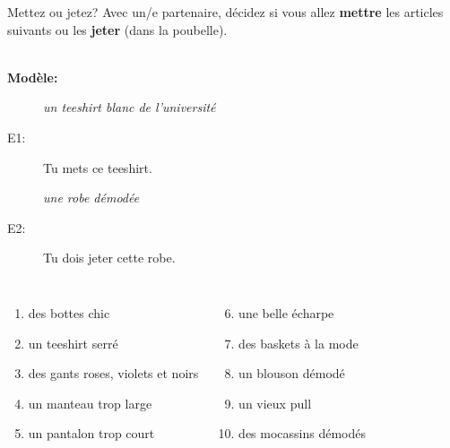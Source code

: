 \begin{frame}{Mettez ou jetez?}
  Avec un/e partenaire, décidez si vous allez \textbf{mettre} les articles suivants ou les \textbf{jeter} (dans la poubelle). \\
   \\
  \begin{description}
    \item[\textbf{Modèle:}] \emph{un teeshirt blanc de l'université}
    \item[E1:] Tu mets ce teeshirt.
    \item[] 
    \item[] \emph{une robe démodée}
    \item[E2:] Tu dois jeter cette robe.
    \item[] 
  \end{description}
  \begin{columns}
      \begin{enumerate}
        \item des bottes chic
        \item un teeshirt serré
        \item des gants roses, violets et noirs
        \item un manteau trop large
        \item un pantalon trop court
      \end{enumerate}
      \begin{enumerate}
        \setcounter{enumi}{5}
        \item une belle écharpe
        \item des baskets à la mode
        \item un blouson démodé
        \item un vieux pull
        \item des mocassins démodés
      \end{enumerate}
  \end{columns}
\end{frame}
